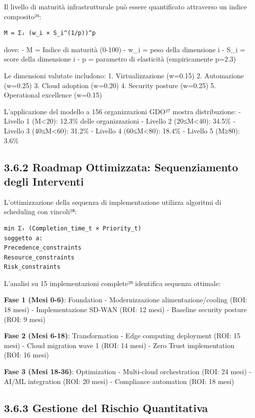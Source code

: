 \documentclass[12pt,a4paper,oneside]{book}
\numberwithin{figure}{chapter} %
\numberwithin{table}{chapter}  %
\begin{document}
Il livello di maturità infrastrutturale può essere quantificato
attraverso un indice composito²⁶:

\begin{verbatim}
M = Σᵢ (w_i × S_i^(1/p))^p
\end{verbatim}

dove: - M = Indice di maturità (0-100) - w\_i = peso della dimensione i
- S\_i = score della dimensione i - p = parametro di elasticità
(empiricamente p=2.3)

Le dimensioni valutate includono: 1. Virtualizzazione (w=0.15) 2.
Automazione (w=0.25) 3. Cloud adoption (w=0.20) 4. Security posture
(w=0.25) 5. Operational excellence (w=0.15)

L'applicazione del modello a 156 organizzazioni GDO²⁷ mostra
distribuzione: - Livello 1 (M\textless20): 12.3\% delle organizzazioni -
Livello 2 (20≤M\textless40): 34.5\% - Livello 3 (40≤M\textless60):
31.2\% - Livello 4 (60≤M\textless80): 18.4\% - Livello 5 (M≥80): 3.6\%

\subsection{3.6.2 Roadmap Ottimizzata: Sequenziamento degli
Interventi}\label{roadmap-ottimizzata-sequenziamento-degli-interventi}

L'ottimizzazione della sequenza di implementazione utilizza algoritmi di
scheduling con vincoli²⁸:

\begin{verbatim}
min Σₜ (Completion_time_t × Priority_t)
soggetto a:
Precedence_constraints
Resource_constraints
Risk_constraints
\end{verbatim}

L'analisi su 15 implementazioni complete²⁹ identifica sequenza ottimale:

\textbf{Fase 1 (Mesi 0-6)}: Foundation - Modernizzazione
alimentazione/cooling (ROI: 18 mesi) - Implementazione SD-WAN (ROI: 12
mesi) - Baseline security posture (ROI: 9 mesi)

\textbf{Fase 2 (Mesi 6-18)}: Transformation - Edge computing deployment
(ROI: 15 mesi) - Cloud migration wave 1 (ROI: 14 mesi) - Zero Trust
implementation (ROI: 16 mesi)

\textbf{Fase 3 (Mesi 18-36)}: Optimization - Multi-cloud orchestration
(ROI: 24 mesi) - AI/ML integration (ROI: 20 mesi) - Compliance
automation (ROI: 18 mesi)

\subsection{3.6.3 Gestione del Rischio
Quantitativa}\label{gestione-del-rischio-quantitativa}
\end{document}
